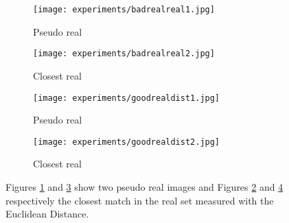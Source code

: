 \begin{figure}[h]
  \centering
  \begin{subfigure}{.24\linewidth}
      \centering
      \texttt{[image: experiments/badrealreal1.jpg]}
      \caption{Pseudo real}\label{fig:badrealdist1}
  \end{subfigure}%
  \hfill
  \begin{subfigure}{.24\linewidth}
    \centering
    \texttt{[image: experiments/badrealreal2.jpg]}
    \caption{Closest real}\label{fig:badrealdist2}
  \end{subfigure}%
  \hfill
  \begin{subfigure}{.24\linewidth}
      \centering
      \texttt{[image: experiments/goodrealdist1.jpg]}
      \caption{Pseudo real}\label{fig:goodrealdist1}
  \end{subfigure}%
  \hfill
  \begin{subfigure}{.24\linewidth}
    \centering
    \texttt{[image: experiments/goodrealdist2.jpg]}
    \caption{Closest real}\label{fig:goodrealdist2}
\end{subfigure}
  \caption{Figures \ref{fig:badrealdist1} and \ref{fig:goodrealdist1} show two pseudo real images and Figures \ref{fig:badrealdist2} and \ref{fig:goodrealdist2} respectively the closest match in the real set measured with the Euclidean Distance.}
  \label{fig:realdistance}
\end{figure}



